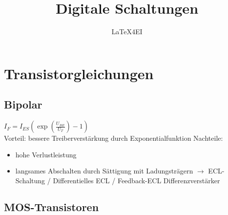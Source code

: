 \documentclass[english]{latex4ei/latex4ei_sheet}
\title{Digitale Schaltungen}
\author{LaTeX4EI}                    %
\begin{document}
\ifdefined\GitRevision{}\fi

\maketitle   %


\section{Transistorgleichungen}

\subsection{Bipolar}
$I_F = I_{ES}\left(\exp\left(\frac{U_{BE}}{U_T}\right)-1\right)$\\
Vorteil: bessere Treiberverstärkung durch Exponentialfunktion
Nachteile:\begin{itemize}
    \item hohe Verlustleistung
    \item langsames Abschalten durch Sättigung mit Ladungsträgern $\rightarrow$ ECL-Schaltung / Differentielles ECL / Feedback-ECL Differenzverstärker
\end{itemize}

\subsection{MOS-Transistoren}
\end{document}
